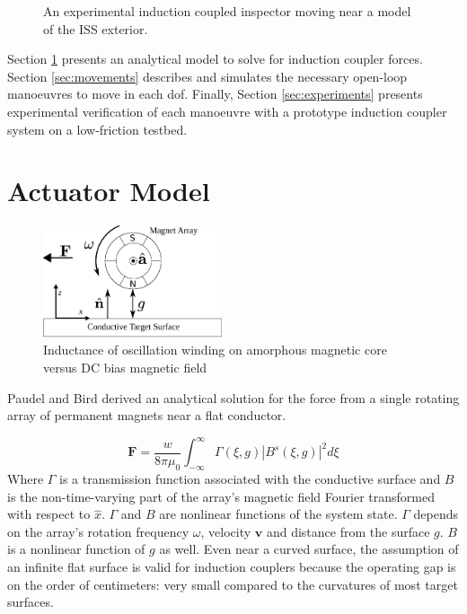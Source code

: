 \documentclass[letterpaper, 10 pt, conference]{ieeeconf}  %
\begin{document}
%
 \begin{figure}[thpb]
      \centering

      \caption{An experimental induction coupled inspector moving near a model of the ISS exterior.}
      \label{fig:realpicture}
   \end{figure}
Section \ref{sec:model} presents an analytical model to solve for induction coupler forces. Section \ref{sec:movements} describes and simulates the necessary open-loop manoeuvres to move in each dof. Finally, Section \ref{sec:experiments} presents experimental verification of each manoeuvre with a prototype induction coupler system on a low-friction testbed.
%

  
\section{Actuator Model}
\label{sec:model}
 \begin{figure}[thpb]
      \centering

      \includegraphics[width = 0.47\textwidth]{figures/spin_mag_diagram.eps}
      \caption{Inductance of oscillation winding on amorphous
       magnetic core versus DC bias magnetic field}
      \label{A single induction coupler}
   \end{figure}
   

Paudel and Bird derived an analytical solution for the force from a single rotating array of permanent magnets near a flat conductor. \cite{Paudel2013}

\begin{equation}
\label{eq:Paudel55}
\textbf{F} = \frac{w}{8\pi\mu_0} \int^{\infty}_{-\infty}\Gamma(\xi,g)|B^s(\xi,g)|^2 d\xi
\end{equation}
Where $\Gamma$ is a transmission function associated with the conductive surface and $B$ is the non-time-varying part of the array's magnetic field Fourier transformed with respect to $\hat{x}$.
% 
 $\Gamma$ and $B$ are nonlinear functions of the system state. $\Gamma$ depends on the array's rotation frequency $\omega$, velocity $\textbf{v}$ and distance from the surface $g$. $B$ is a nonlinear function of $g$ as well. Even near a curved surface, the assumption of an infinite flat surface is valid for induction couplers because the operating gap is on the order of centimeters: very small compared to the curvatures of most target surfaces. 
 
\end{document}
